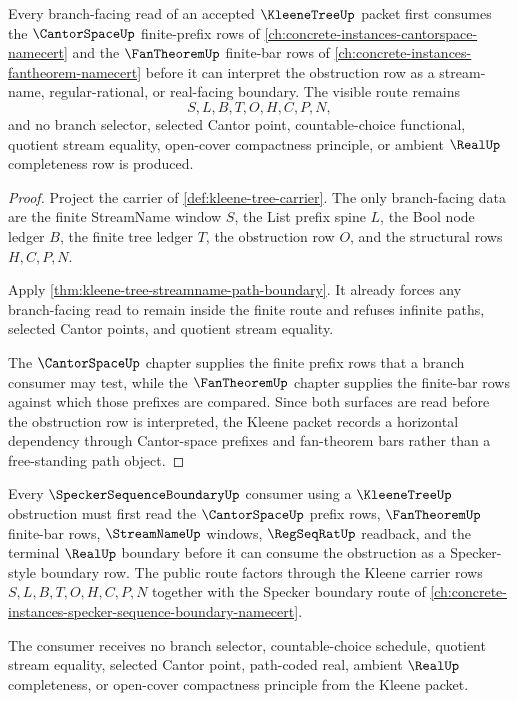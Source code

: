 \begin{theorem}
\label{thm:kleene-tree-cantor-fan-dependency-route}
Every branch-facing read of an accepted $\KleeneTreeUp$ packet first consumes the $\CantorSpaceUp$ finite-prefix rows of \autoref{ch:concrete-instances-cantorspace-namecert} and the $\FanTheoremUp$ finite-bar rows of \autoref{ch:concrete-instances-fantheorem-namecert} before it can interpret the obstruction row as a stream-name, regular-rational, or real-facing boundary. The visible route remains
$$
S,L,B,T,O,H,C,P,N,
$$
and no branch selector, selected Cantor point, countable-choice functional, quotient stream equality, open-cover compactness principle, or ambient $\RealUp$ completeness row is produced.
\end{theorem}
\begin{proof}
Project the carrier of \autoref{def:kleene-tree-carrier}. The only branch-facing data are the finite StreamName window $S$, the List prefix spine $L$, the Bool node ledger $B$, the finite tree ledger $T$, the obstruction row $O$, and the structural rows $H,C,P,N$.

Apply \autoref{thm:kleene-tree-streamname-path-boundary}. It already forces any branch-facing read to remain inside the finite route and refuses infinite paths, selected Cantor points, and quotient stream equality.

The $\CantorSpaceUp$ chapter supplies the finite prefix rows that a branch consumer may test, while the $\FanTheoremUp$ chapter supplies the finite-bar rows against which those prefixes are compared. Since both surfaces are read before the obstruction row is interpreted, the Kleene packet records a horizontal dependency through Cantor-space prefixes and fan-theorem bars rather than a free-standing path object.
\end{proof}

\begin{theorem}
\label{thm:kleene-tree-specker-boundary-route}
Every $\SpeckerSequenceBoundaryUp$ consumer using a $\KleeneTreeUp$ obstruction must first read the $\CantorSpaceUp$ prefix rows, $\FanTheoremUp$ finite-bar rows, $\StreamNameUp$ windows, $\RegSeqRatUp$ readback, and the terminal $\RealUp$ boundary before it can consume the obstruction as a Specker-style boundary row. The public route factors through the Kleene carrier rows $S,L,B,T,O,H,C,P,N$ together with the Specker boundary route of \autoref{ch:concrete-instances-specker-sequence-boundary-namecert}.

The consumer receives no branch selector, countable-choice schedule, quotient stream equality, selected Cantor point, path-coded real, ambient $\RealUp$ completeness, or open-cover compactness principle from the Kleene packet.
\end{theorem}

